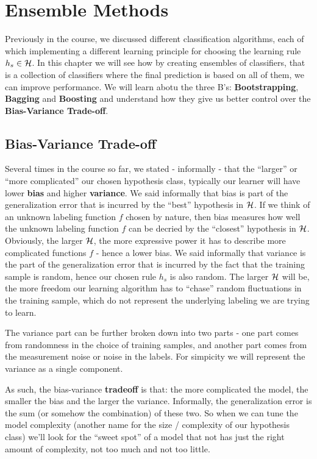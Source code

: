 \chapter{Ensemble Methods}
Previously in the course, we discussed different classification algorithms, each of which implementing a different learning principle for choosing the learning rule $h_s\in\mathcal{H}$. In this chapter we will see how by creating ensembles of classifiers, that is a collection of classifiers where the final prediction is based on all of them, we can improve performance.
We will learn abotu the three B's: \textbf{Bootstrapping}, \textbf{Bagging} and \textbf{Boosting} and understand how they give us better control over the \textbf{Bias-Variance Trade-off}.
\section{Bias-Variance Trade-off}

Several times in the course so far, we stated - informally - that the “larger” or “more complicated” our chosen hypothesis class, typically our learner will have lower \textbf{bias} and higher \textbf{variance}. We said informally that bias is part of the generalization error that is incurred by the “best” hypothesis in $\mathcal{H}$. If we think of an unknown labeling function $f$ chosen by nature, then bias measures how well the unknown labeling function $f$ can be decried by the “closest” hypothesis in $\mathcal{H}$. Obviously, the larger $\mathcal{H}$, the more expressive power it has to describe more complicated functions $f$ - hence a lower bias. We said informally that variance is the part of the generalization error that is incurred by the fact that the training sample is random, hence our chosen rule $h_s$ is also random. The larger $\mathcal{H}$ will be, the more freedom our learning algorithm has to “chase” random fluctuations in the training sample, which do not represent the underlying labeling we are trying to learn. 
    	
\begin{remark}
The variance part  can be further broken down into two parts - one part comes from randomness in the choice of training samples, and another part comes from the measurement noise or noise in the labels. For simpicity we will represent the variance as a single component.
\end{remark}
    
As such, the bias-variance \textbf{tradeoff} is that: the more complicated the model, the smaller the bias and the larger the variance. Informally, the generalization error is the sum (or somehow the combination) of these two. So when we can tune the model complexity (another name for the size / complexity of our hypothesis class) we’ll look for the “sweet spot” of a model that not has just the right amount of complexity, not too much and not too little.
    	
